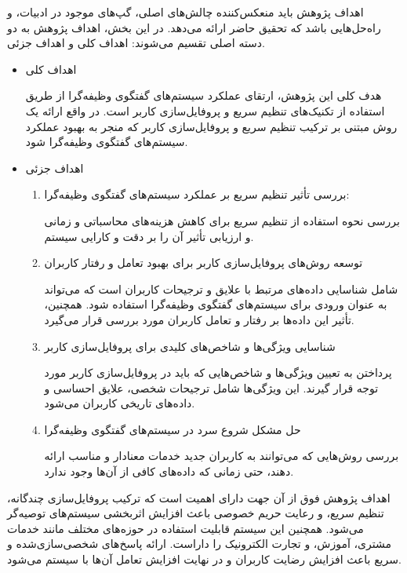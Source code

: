 اهداف پژوهش باید منعکس‌کننده چالش‌های اصلی، گپ‌های موجود در ادبیات، و راه‌حل‌هایی باشد که تحقیق حاضر ارائه می‌دهد. در این بخش، اهداف پژوهش به دو دسته اصلی تقسیم می‌شوند: اهداف کلی و اهداف جزئی.

\begin{itemize}
\item
اهداف کلی

هدف کلی این پژوهش، ارتقای عملکرد سیستم‌های گفتگوی وظیفه‌گرا از طریق استفاده از تکنیک‌های تنظیم سریع و پروفایل‌سازی کاربر است. در واقع ارائه یک روش مبتنی بر ترکیب تنظیم سریع و پروفایل‌سازی کاربر که منجر به بهبود عملکرد سیستم‌های گفتگوی وظیفه‌گرا شود.

\item
اهداف جزئی
\begin{enumerate}
\item
بررسی تأثیر تنظیم سریع بر عملکرد سیستم‌های گفتگوی وظیفه‌گرا:

بررسی نحوه استفاده از تنظیم سریع برای کاهش هزینه‌های محاسباتی و زمانی و ارزیابی تأثیر آن را بر دقت و کارایی سیستم.

\item
توسعه روش‌های پروفایل‌سازی کاربر برای بهبود تعامل و رفتار کاربران

شامل شناسایی داده‌های مرتبط با علایق و ترجیحات کاربران است که می‌تواند به عنوان ورودی برای سیستم‌های گفتگوی وظیفه‌گرا استفاده شود. همچنین، تأثیر این داده‌ها بر رفتار و تعامل کاربران مورد بررسی قرار می‌گیرد.

\item
شناسایی ویژگی‌ها و شاخص‌های کلیدی برای پروفایل‌سازی کاربر

پرداختن به تعیین ویژگی‌ها و شاخص‌هایی که باید در پروفایل‌سازی کاربر مورد توجه قرار گیرند. این ویژگی‌ها شامل ترجیحات شخصی، علایق احساسی و داده‌های تاریخی کاربران می‌شود.

\item
حل مشکل شروع سرد در سیستم‌های گفتگوی وظیفه‌گرا

بررسی روش‌هایی که می‌توانند به کاربران جدید خدمات معنادار و مناسب ارائه دهند، حتی زمانی که داده‌های کافی از آن‌ها وجود ندارد.
\end{enumerate}
\end{itemize}

اهداف پژوهش فوق از آن جهت دارای اهمیت است که ترکیب پروفایل‌سازی چندگانه، تنظیم سریع، و رعایت حریم خصوصی باعث افزایش اثربخشی سیستم‌های توصیه‌گر می‌شود. همچنین این سیستم قابلیت استفاده در حوزه‌های مختلف مانند خدمات مشتری، آموزش، و تجارت الکترونیک را داراست. ارائه پاسخ‌های شخصی‌سازی‌شده و سریع باعث افزایش رضایت کاربران و در نهایت افزایش تعامل آن‌ها با سیستم می‌شود.


